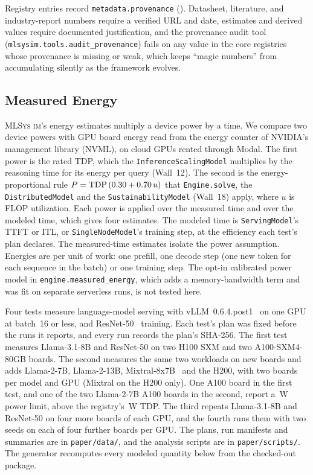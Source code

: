 \documentclass[10pt,twocolumn]{article}
\newcommand{\mlsysim}{\mbox{\textsc{MLSys}\,\textperiodcentered\,\textsc{im}}\xspace}
\begin{document}
Registry entries record \texttt{metadata.provenance} (). Datasheet, literature, and industry-report numbers require a verified URL and date, estimates and derived values require documented justification, and the provenance audit tool (\texttt{mlsysim.tools.audit\_provenance}) fails on any value in the core registries whose provenance is missing or weak, which keeps ``magic numbers'' from accumulating silently as the framework evolves.

\subsection{Measured Energy}
\label{sec:validation-energy}

\mlsysim's energy estimates multiply a device power by a time. We compare two device powers with GPU board energy read from the energy counter of NVIDIA's management library (NVML), on cloud GPUs rented through Modal. The first power is the rated TDP, which the \texttt{InferenceScalingModel} multiplies by the reasoning time for its energy per query (Wall~12). The second is the energy-proportional rule $P = \text{TDP}\,(0.30 + 0.70\,u)$ that \texttt{Engine.solve}, the \texttt{DistributedModel} and the \texttt{SustainabilityModel} (Wall~18) apply, where $u$ is FLOP utilization. Each power is applied over the measured time and over the modeled time, which gives four estimates. The modeled time is \texttt{ServingModel}'s TTFT or ITL, or \texttt{SingleNodeModel}'s training step, at the efficiency each test's plan declares. The measured-time estimates isolate the power assumption. Energies are per unit of work: one prefill, one decode step (one new token for each sequence in the batch) or one training step. The opt-in calibrated power model in \texttt{engine.measured\_energy}, which adds a memory-bandwidth term and was fit on separate serverless runs, is not tested here.

Four tests measure language-model serving with vLLM~0.6.4.post1~\citep{kwon2023} on one GPU at batch~16 or less, and ResNet-50~\citep{he2016} training. Each test's plan was fixed before the runs it reports, and every run records the plan's SHA-256. The first test measures Llama-3.1-8B and ResNet-50 on two H100 SXM and two A100-SXM4-80GB boards. The second measures the same two workloads on new boards and adds Llama-2-7B, Llama-2-13B, Mixtral-8x7B~\citep{jiang2024mixtral} and the H200, with two boards per model and GPU (Mixtral on the H200 only). One A100 board in the first test, and one of the two Llama-2-7B A100 boards in the second, report a \EnergyAhLimitW\,W power limit, above the registry's \EnergyAhTdpW\,W TDP. The third repeats Llama-3.1-8B and ResNet-50 on four more boards of each GPU, and the fourth runs them with two seeds on each of four further boards per GPU. The plans, run manifests and summaries are in \texttt{paper/data/}, and the analysis scripts are in \texttt{paper/scripts/}. The generator recomputes every modeled quantity below from the checked-out package.
\end{document}
